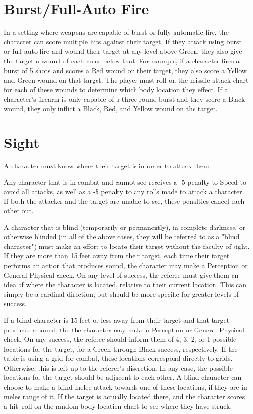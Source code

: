 \documentclass[oneside]{book}
\begin{document}
\begin{multicols}{2}
\section{Burst/Full-Auto Fire}
In a setting where weapons are capable of burst or fully-automatic fire, the character can score multiple hits against their target. If they attack using burst or full-auto fire and wound their target at any level above Green, they also give the target a wound of each color below that. For example, if a character fires a burst of 5 shots and scores a Red wound on their target, they also score a Yellow and Green wound on that target. The player must roll on the missile attack chart for each of these wounds to determine which body location they effect. If a character's firearm is only capable of a three-round burst and they score a Black wound, they only inflict a Black, Red, and Yellow wound on the target. 

\section{Sight}
A character must know where their target is in order to attack them. 

Any character that is in combat and cannot see receives a -5 penalty to Speed to avoid all attacks, as well as a -5 penalty to any rolls made to attack a character. If both the attacker and the target are unable to see, these penalties cancel each other out. 

A character that is blind (temporarily or permanently), in complete darkness, or otherwise blinded (in all of the above cases, they will be referred to as a "blind character") must make an effort to locate their target without the faculty of sight. If they are more than 15 feet away from their target, each time their target performs an action that produces sound, the character may make a Perception or General Physical check. On any level of success, the referee must give them an idea of where the character is located, relative to their current location. This can simply be a cardinal direction, but should be more specific for greater levels of success. 

If a blind character is 15 feet or less away from their target and that target produces a sound, the the character may make a Perception or General Physical check. On any success, the referee should inform them of 4, 3, 2, or 1 possible locations for the target, for a Green through Black success, respectively. If the table is using a grid for combat, these locations correspond directly to grids. Otherwise, this is left up to the referee's discretion. In any case, the possible locations for the target should be adjacent to each other. A blind character can choose to make a blind melee attack towards one of these locations, if they are in melee range of it. If the target is actually located there, and the character scores a hit, roll on the random body location chart to see where they have struck. 


\end{multicols}
\end{document}
